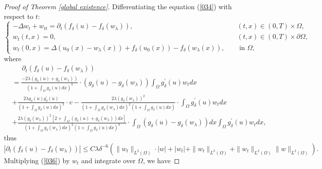 \documentclass{article}
\numberwithin{equation}{section}
\begin{document}
\begin{proof}[Proof of Theorem \ref{global existence}]
Differentiating the equation (\ref{034}) with respect to $t$:
\begin{equation}
\left\{\begin{array}{lll}
 -\Delta w_t+w_{tt}=\partial_{t}\left(f_{\delta}(u)
-f_{\delta}\left(w_{\lambda}\right)\right),\quad & (t,x) \in(0, T)\times \Omega,
\\  w_{t}(t, x)=0 ,\quad& (t,x) \in(0, T)\times \partial \Omega,
\\  w_{t}(0, x)=\Delta\left(u_{0}(x)-w_{\lambda}(x)\right)
+f_{\delta}(u_0(x))-f_{\delta}\left(w_{\lambda}(x)
\right) ,\quad & \text { in } \Omega,
\end{array}\quad \right. \label{036}
\end{equation}
where
\begin{equation*}
\begin{aligned}
&\quad\ \ \partial_{t}\left(f_{\delta}(u)-f_{\delta}\left(w_{\lambda}\right)\right)\\
&=\frac{-2 \lambda\left(g_{\delta}(u)+g_{\delta}\left(w_{\lambda}\right)\right)}{\left(1+\int_{\Omega} g_{\delta}(u) d x\right)^{3}} \cdot\left(g_{\delta}(u)-g_{\delta}\left(w_{\lambda}\right)\right) \int_{\Omega} g_{\delta}^{\prime}(u) w_{t} d x
\\  &+\frac{2 \lambda g_{\delta}(u) g_{\delta}^{\prime}(u)}{\left(1+\int_{\Omega} g_{\delta}(u) d x\right)^{2}} \cdot v-\frac{2 \lambda\left(g_{\delta}\left(w_{\lambda}\right)\right)^{2}}{\left(1+\int_{\Omega} g_{\delta}\left(w_{\lambda}\right) d x\right)^{2}\left(1+\int_{\Omega} g_{\delta}(u) d x\right)} \cdot \int_{\Omega} g_{\delta}^{\prime}(u) w_{t} d x
\\  &+\frac{2 \lambda\left(g_{\delta}\left(w_{\lambda}\right)\right)^{2}\left[2+\int_{\Omega}\left(g_{\delta}(u)+g_{\delta}\left(w_{\lambda}\right)\right) d x\right]}{\left(1+\int_{\Omega} g_{\delta}\left(w_{\lambda}\right) d x\right)^{2}\left(1+\int_{\Omega} g_{\delta}(u) d x\right)^{3}} \cdot \int_{\Omega}\left(g_{\delta}(u)-g_{\delta}\left(w_{\lambda}\right)\right) d x \int_{\Omega} g_{\delta}^{\prime}(u) w_{t} d x,
\end{aligned}
\end{equation*}
thus
\begin{equation}
\left|\partial_{t}\left(f_{\delta}(u)-f_{\delta}\left(w_{\lambda}\right)\right)\right| \le C \lambda \delta^{-6}\left(\|w_{t}\|_{L^{2}(\Omega)} \cdot|w|+|w_{t}|+\|w_{t}\|_{L^{2}(\Omega)}+\|w_{t}\|_{L^{2}(\Omega)}
\|w\|_{L^{2}(\Omega)}\right).	\label{037}
\end{equation}
Multiplying (\ref{036}) by $w_t$ and integrate over $\Omega$, we have

\end{proof}
\end{document}
